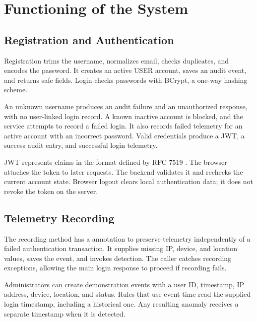 \chapter{Functioning of the System}
\section{Registration and Authentication}
Registration trims the username, normalizes email, checks duplicates, and encodes the password. It creates an active USER account, saves an audit event, and returns safe fields. Login checks passwords with BCrypt, a one-way hashing scheme.

An unknown username produces an audit failure and an unauthorized response, with no user-linked login record. A known inactive account is blocked, and the service attempts to record a failed login. It also records failed telemetry for an active account with an incorrect password. Valid credentials produce a JWT, a success audit entry, and successful login telemetry.

JWT represents claims in the format defined by RFC 7519 \cite{jwt}. The browser attaches the token to later requests. The backend validates it and rechecks the current account state. Browser logout clears local authentication data; it does not revoke the token on the server.

\section{Telemetry Recording}
The recording method has a  annotation to preserve telemetry independently of a failed authentication transaction. It supplies missing IP, device, and location values, saves the event, and invokes detection. The caller catches recording exceptions, allowing the main login response to proceed if recording fails.

Administrators can create demonstration events with a user ID, timestamp, IP address, device, location, and status. Rules that use event time read the supplied login timestamp, including a historical one. Any resulting anomaly receives a separate timestamp when it is detected.

